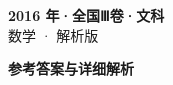 \documentclass[zihao=-4, a4paper]{ctexart}
\begin{document}
\begin{center}
  {\Large\bfseries 2016 年·全国Ⅲ卷·文科}\\[4pt]
  {\large 数学 · 解析版}
\end{center}
\medskip
{}

\clearpage
{}
\begin{center}{\Large\bfseries 参考答案与详细解析}\end{center}
\medskip

\end{document}
